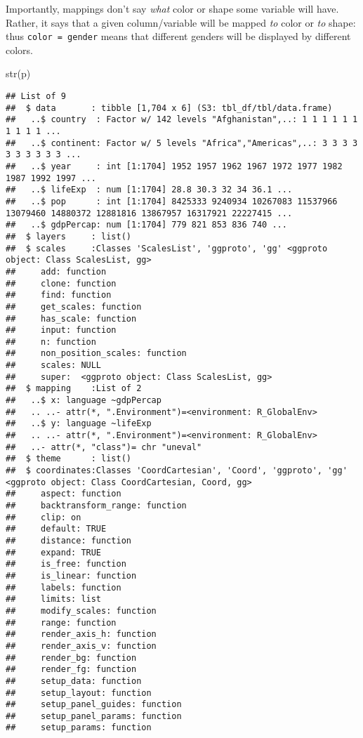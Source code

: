 \documentclass[
]{article}
\newenvironment{Shaded}{\begin{snugshade}}{\end{snugshade}}
\newcommand{\FunctionTok}[1]{\textcolor[rgb]{0.00,0.00,0.00}{#1}}
\newcommand{\NormalTok}[1]{#1}
\begin{document}
Importantly, mappings don't say \emph{what} color or shape some variable
will have. Rather, it says that a given column/variable will be mapped
\emph{to} color or \emph{to} shape: thus \texttt{color\ =\ gender} means
that different genders will be displayed by different colors.

\begin{Shaded}
\begin{Highlighting}[]
\FunctionTok{str}\NormalTok{(p)}
\end{Highlighting}
\end{Shaded}

\begin{verbatim}
## List of 9
##  $ data       : tibble [1,704 x 6] (S3: tbl_df/tbl/data.frame)
##   ..$ country  : Factor w/ 142 levels "Afghanistan",..: 1 1 1 1 1 1 1 1 1 1 ...
##   ..$ continent: Factor w/ 5 levels "Africa","Americas",..: 3 3 3 3 3 3 3 3 3 3 ...
##   ..$ year     : int [1:1704] 1952 1957 1962 1967 1972 1977 1982 1987 1992 1997 ...
##   ..$ lifeExp  : num [1:1704] 28.8 30.3 32 34 36.1 ...
##   ..$ pop      : int [1:1704] 8425333 9240934 10267083 11537966 13079460 14880372 12881816 13867957 16317921 22227415 ...
##   ..$ gdpPercap: num [1:1704] 779 821 853 836 740 ...
##  $ layers     : list()
##  $ scales     :Classes 'ScalesList', 'ggproto', 'gg' <ggproto object: Class ScalesList, gg>
##     add: function
##     clone: function
##     find: function
##     get_scales: function
##     has_scale: function
##     input: function
##     n: function
##     non_position_scales: function
##     scales: NULL
##     super:  <ggproto object: Class ScalesList, gg> 
##  $ mapping    :List of 2
##   ..$ x: language ~gdpPercap
##   .. ..- attr(*, ".Environment")=<environment: R_GlobalEnv> 
##   ..$ y: language ~lifeExp
##   .. ..- attr(*, ".Environment")=<environment: R_GlobalEnv> 
##   ..- attr(*, "class")= chr "uneval"
##  $ theme      : list()
##  $ coordinates:Classes 'CoordCartesian', 'Coord', 'ggproto', 'gg' <ggproto object: Class CoordCartesian, Coord, gg>
##     aspect: function
##     backtransform_range: function
##     clip: on
##     default: TRUE
##     distance: function
##     expand: TRUE
##     is_free: function
##     is_linear: function
##     labels: function
##     limits: list
##     modify_scales: function
##     range: function
##     render_axis_h: function
##     render_axis_v: function
##     render_bg: function
##     render_fg: function
##     setup_data: function
##     setup_layout: function
##     setup_panel_guides: function
##     setup_panel_params: function
##     setup_params: function

\end{verbatim}
\end{document}
